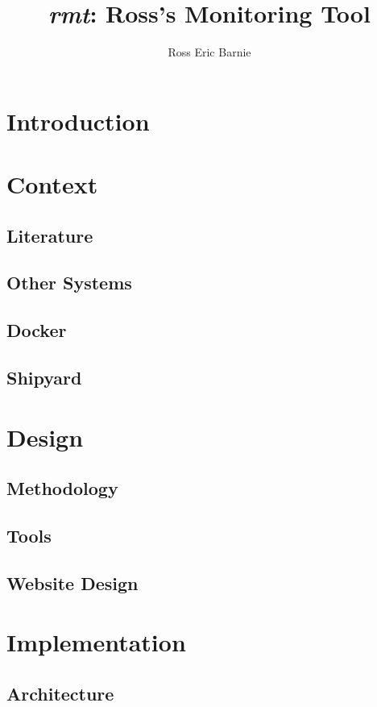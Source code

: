 \documentclass{l4proj}
\title{\emph{rmt}: Ross's Monitoring Tool}
\author{Ross Eric Barnie}
\begin{document}
\maketitle
\tableofcontents



\chapter{Introduction}


\chapter{Context}
\section{Literature}
\section{Other Systems}
\section{Docker}
\section{Shipyard}

\chapter{Design}
\section{Methodology}

\section{Tools}

\section{Website Design}


\chapter{Implementation}
\section{Architecture}

\end{document}
